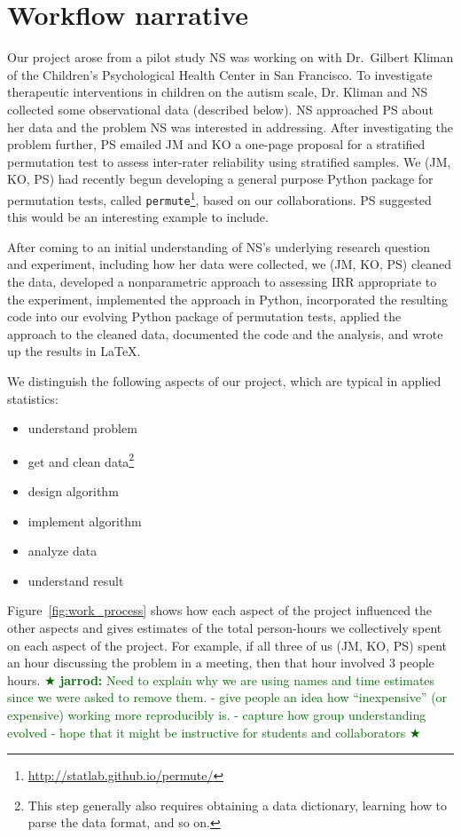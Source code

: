 \documentclass[]{article}
\newcommand{\jarrod}[1] { \textcolor{darkgreen} {
\ensuremath{\bigstar} {\bf jarrod:}  {#1}
\ensuremath{\bigstar} } }
\begin{document}
\section{Workflow narrative}\label{workflow-narrative}

Our project arose from a pilot study NS was working on with Dr.~Gilbert Kliman of
the Children's Psychological Health Center in San Francisco.
To investigate therapeutic interventions in children on the autism scale,
Dr. Kliman and NS collected some observational data (described below).
NS approached PS about her data and
the problem NS was interested in addressing.
After investigating the problem further, PS emailed JM and KO a one-page
proposal for a stratified permutation test to assess inter-rater
reliability using stratified samples.
We (JM, KO, PS) had recently begun developing a general purpose Python package
for permutation tests, called
\texttt{permute}\footnote{\url{http://statlab.github.io/permute/}},
based on our collaborations.
PS suggested this would be an interesting example to include.

After coming to an initial understanding of NS's underlying research question
and experiment, including how her data were collected, we (JM, KO, PS) 
cleaned the data, developed a nonparametric approach to assessing IRR
appropriate to the experiment, implemented the approach in Python, incorporated
the resulting code into our evolving Python package of permutation tests,
applied the approach to the cleaned data, documented the code and the analysis,
and wrote up the results in \LaTeX. 

We distinguish the following aspects of our project, which are typical in
applied statistics:
\begin{itemize}
    \item understand problem
    \item get and clean data\footnote{
        This step generally also requires obtaining a data dictionary, learning
        how to parse the data format, and so on.
        }
    \item design algorithm
    \item implement algorithm
    \item analyze data
    \item understand result
\end{itemize}
Figure~\ref{fig:work_process} shows how each aspect of the
project influenced the other aspects and gives estimates of the total person-hours
we collectively spent on each aspect of the project.
For example, if all three of us (JM, KO, PS) spent an hour discussing the
problem in a meeting, then that hour involved 3 people hours.
\jarrod{Need to explain why we are using names and time estimates since
we were asked to remove them.
- give people an idea how ``inexpensive'' (or expensive) working more
  reproducibly is.
- capture how group understanding evolved
- hope that it might be instructive for students and collaborators
}
\end{document}
